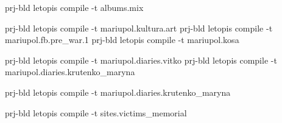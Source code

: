  
 
 
 
 

prj-bld letopis compile -t albums.mix

prj-bld letopis compile -t mariupol.kultura.art
prj-bld letopis compile -t mariupol.fb.pre_war.1
prj-bld letopis compile -t mariupol.kosa

prj-bld letopis compile -t mariupol.diaries.vitko
prj-bld letopis compile -t mariupol.diaries.krutenko_maryna

prj-bld letopis compile -t mariupol.diaries.krutenko_maryna

prj-bld letopis compile -t sites.victims_memorial
